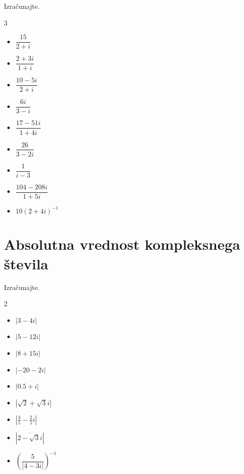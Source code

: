             \begin{naloga}
                Izračunajte.

                \begin{multicols}{3}
                \begin{itemize}
                        \item $\dfrac{15}{2+i}$ 
                        \item $\dfrac{2+3i}{1+i}$ 
                        \item $\dfrac{10-5i}{2+i}$ 
                        \item $\dfrac{6i}{3-i}$ 
                        \item $\dfrac{17-51i}{1+4i}$ 
                        \item $\dfrac{26}{3-2i}$ 
                        \item $\dfrac{1}{i-3}$ 
                        \item $\dfrac{104-208i}{1+5i}$ 
                        \item $10\left(2+4i\right)^{-1}$ 
                    \end{itemize}
                \end{multicols}

                \end{naloga}

        


\newpage
    \section{Absolutna vrednost kompleksnega števila}


    \newpage


            \begin{naloga}
                Izračunajte.
                \begin{multicols}{2}
                    
                    \begin{itemize}
                        \item $\left| 3-4i \right| $ 
                        \item $\left| 5-12i \right| $ 
                        \item $\left| 8+15i \right| $ 
                        \item $\left| -20-2i \right| $ 
                        \item $\left| 0.5+i \right| $ 
                        \item $\left| \sqrt{2}+\sqrt{3}i \right| $ 
                        \item $\left| \frac{3}{5}-\frac{2}{5}i \right| $ 
                        \item $\left| \overline{2-\sqrt{3}i} \right| $ 
                        \item $\left(\dfrac{5}{\left| 4-3i\right|}\right)^{-1} $ 
                    \end{itemize}
                \end{multicols}
            \end{naloga}

